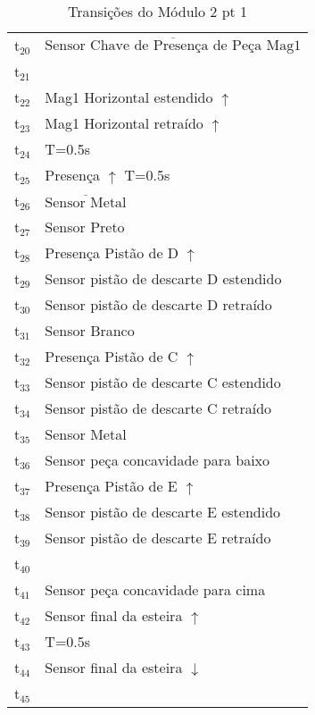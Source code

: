 \begin{table}[htbp]
\caption{Transições do Módulo 2 pt 1}
\centering
\begin{tabular}{ll}
t\(_{\text{20}}\) & \(\overline{\mbox{Sensor Chave de Presença de Peça Mag1}}\)\\
t\(_{\text{21}}\) & \\
t\(_{\text{22}}\) & Mag1 Horizontal estendido \(\uparrow\)\\
t\(_{\text{23}}\) & Mag1 Horizontal retraído \(\uparrow\)\\
t\(_{\text{24}}\) & T=0.5s\\
t\(_{\text{25}}\) & Presença \(\uparrow\) T=0.5s\\
t\(_{\text{26}}\) & \(\overline{\mbox{Sensor Metal}}\)\\
t\(_{\text{27}}\) & Sensor Preto\\
t\(_{\text{28}}\) & Presença Pistão de D \(\uparrow\)\\
t\(_{\text{29}}\) & Sensor pistão de descarte D estendido\\
t\(_{\text{30}}\) & Sensor pistão de descarte D retraído\\
t\(_{\text{31}}\) & Sensor Branco\\
t\(_{\text{32}}\) & Presença Pistão de C \(\uparrow\)\\
t\(_{\text{33}}\) & Sensor pistão de descarte C estendido\\
t\(_{\text{34}}\) & Sensor pistão de descarte C retraído\\
t\(_{\text{35}}\) & Sensor Metal\\
t\(_{\text{36}}\) & Sensor peça concavidade para baixo\\
t\(_{\text{37}}\) & Presença Pistão de E \(\uparrow\)\\
t\(_{\text{38}}\) & Sensor pistão de descarte E estendido\\
t\(_{\text{39}}\) & Sensor pistão de descarte E retraído\\
t\(_{\text{40}}\) & \\
t\(_{\text{41}}\) & Sensor peça concavidade para cima\\
t\(_{\text{42}}\) & Sensor final da esteira \(\uparrow\)\\
t\(_{\text{43}}\) & T=0.5s\\
t\(_{\text{44}}\) & Sensor final da esteira \(\downarrow\)\\
t\(_{\text{45}}\) & \\
\end{tabular}
\end{table}
